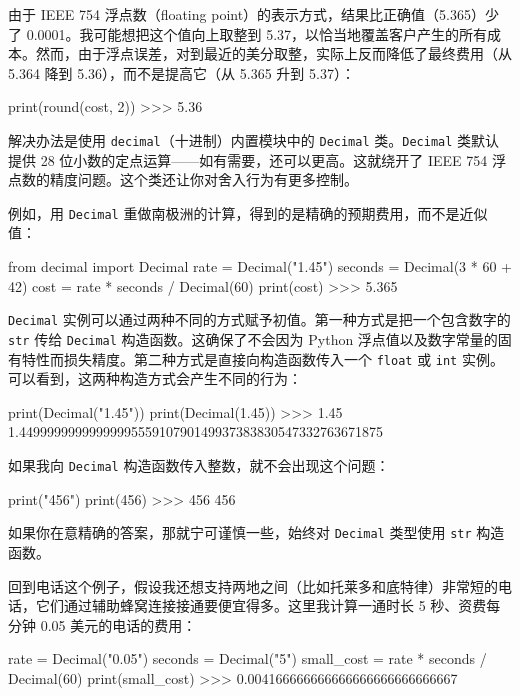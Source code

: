 由于 IEEE 754 浮点数（floating point）的表示方式，结果比正确值（5.365）少了 0.0001。我可能想把这个值向上取整到 5.37，以恰当地覆盖客户产生的所有成本。然而，由于浮点误差，对到最近的美分取整，实际上反而降低了最终费用（从 5.364 降到 5.36），而不是提高它（从 5.365 升到 5.37）：

\begin{codebox}[python]
print(round(cost, 2))
>>>
5.36
\end{codebox}

解决办法是使用 \texttt{decimal}（十进制）内置模块中的 \texttt{Decimal} 类。\texttt{Decimal} 类默认提供 28 位小数的定点运算——如有需要，还可以更高。这就绕开了 IEEE 754 浮点数的精度问题。这个类还让你对舍入行为有更多控制。

例如，用 \texttt{Decimal} 重做南极洲的计算，得到的是精确的预期费用，而不是近似值：

\begin{codebox}[python]
from decimal import Decimal
rate = Decimal("1.45")
seconds = Decimal(3 * 60 + 42)
cost = rate * seconds / Decimal(60)
print(cost)
>>>
5.365
\end{codebox}

\texttt{Decimal} 实例可以通过两种不同的方式赋予初值。第一种方式是把一个包含数字的 \texttt{str} 传给 \texttt{Decimal} 构造函数。这确保了不会因为 Python 浮点值以及数字常量的固有特性而损失精度。第二种方式是直接向构造函数传入一个 \texttt{float} 或 \texttt{int} 实例。可以看到，这两种构造方式会产生不同的行为：

\begin{codebox}[python]
print(Decimal("1.45"))
print(Decimal(1.45))
>>>
1.45
1.4499999999999999555910790149937383830547332763671875
\end{codebox}

如果我向 \texttt{Decimal} 构造函数传入整数，就不会出现这个问题：

\begin{codebox}[python]
print("456")
print(456)
>>>
456
456
\end{codebox}

如果你在意精确的答案，那就宁可谨慎一些，始终对 \texttt{Decimal} 类型使用 \texttt{str} 构造函数。

回到电话这个例子，假设我还想支持两地之间（比如托莱多和底特律）非常短的电话，它们通过辅助蜂窝连接接通要便宜得多。这里我计算一通时长 5 秒、资费每分钟 0.05 美元的电话的费用：

\begin{codebox}[python]
rate = Decimal("0.05")
seconds = Decimal("5")
small_cost = rate * seconds / Decimal(60)
print(small_cost)
>>>
0.004166666666666666666666666667
\end{codebox}

